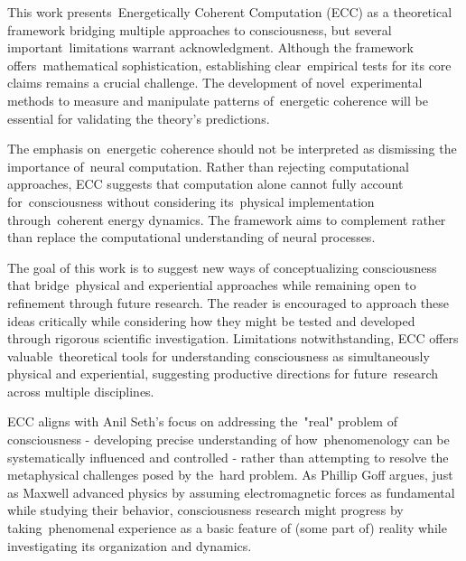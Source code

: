 This work presents~Energetically Coherent Computation (ECC) as a theoretical framework bridging multiple approaches to consciousness, but several important~limitations warrant acknowledgment. Although the framework offers~mathematical sophistication, establishing clear~empirical tests for its core claims remains a crucial challenge. The development of novel~experimental methods to measure and manipulate patterns of~energetic coherence will be essential for validating the theory's predictions.

The emphasis on~energetic coherence should not be interpreted as dismissing the importance of~neural computation. Rather than rejecting computational approaches, ECC suggests that computation alone cannot fully account for~consciousness without considering its~physical implementation through~coherent energy dynamics. The framework aims to complement rather than replace the computational understanding of neural processes.

The goal of this work is to suggest new ways of conceptualizing consciousness that bridge~physical and experiential approaches while remaining open to refinement through future research. The reader is encouraged to approach these ideas critically while considering how they might be tested and developed through rigorous scientific investigation. Limitations notwithstanding, ECC offers valuable~theoretical tools for understanding consciousness as simultaneously physical and experiential, suggesting productive directions for future~research across multiple disciplines.

ECC aligns with Anil Seth's focus on addressing the~"real" problem of consciousness - developing precise understanding of how~phenomenology can be systematically influenced and controlled - rather than attempting to resolve the metaphysical challenges posed by the~hard problem. As Phillip Goff argues, just as Maxwell advanced physics by assuming electromagnetic forces as fundamental while studying their behavior, consciousness research might progress by taking~phenomenal experience as a basic feature of (some part of) reality while investigating its organization and dynamics.

